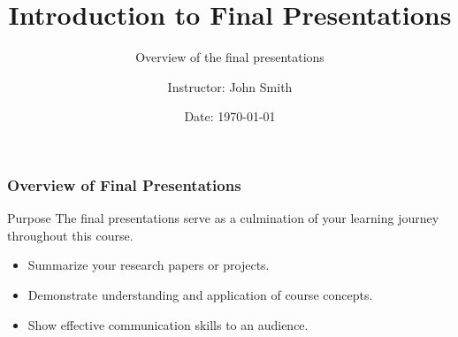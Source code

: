 \documentclass[aspectratio=169]{beamer}
\begin{document}
\frame{\titlepage}

\begin{frame}[fragile]
    \title{Introduction to Final Presentations}
    \subtitle{Overview of the final presentations}
    \author{Instructor: John Smith}
    \date{Date: \today}
    \maketitle
\end{frame}

\begin{frame}[fragile]
    \frametitle{Overview of Final Presentations}
    \begin{block}{Purpose}
        The final presentations serve as a culmination of your learning journey throughout this course.
    \end{block}
    \begin{itemize}
        \item Summarize your research papers or projects.
        \item Demonstrate understanding and application of course concepts.
        \item Show effective communication skills to an audience.
    \end{itemize}
\end{frame}
\end{document}

